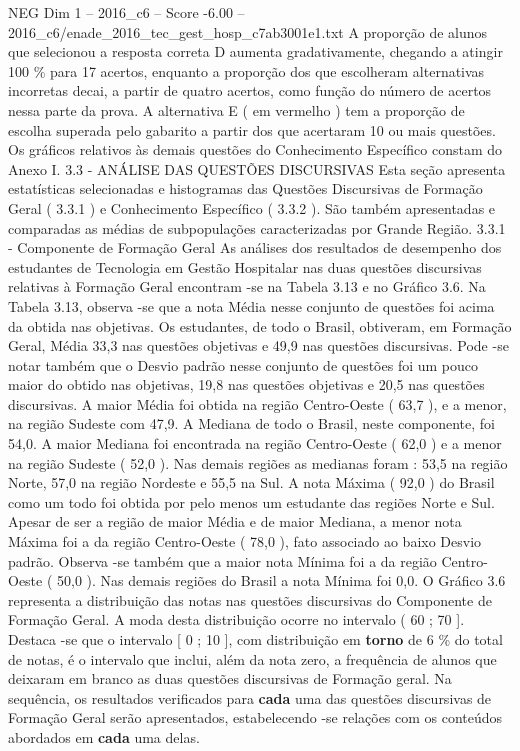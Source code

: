 \begin{textsample}{NEG Dim 1 – 2016\_c6 – Score -6.00 – 2016\_c6/enade\_2016\_tec\_gest\_hosp\_c7ab3001e1.txt}
A proporção de alunos que selecionou a resposta correta D aumenta gradativamente, chegando a atingir 100 \% para 17 acertos, enquanto a proporção dos que escolheram alternativas incorretas decai, a partir de quatro acertos, como função do número de acertos nessa parte da prova.
A alternativa E ( em vermelho ) tem a proporção de escolha superada pelo gabarito a partir dos que acertaram 10 ou mais questões.
Os gráficos relativos às demais questões do Conhecimento Específico constam do Anexo I. 3.3 - ANÁLISE DAS QUESTÕES DISCURSIVAS Esta seção apresenta estatísticas selecionadas e histogramas das Questões Discursivas de Formação Geral ( 3.3.1 ) e Conhecimento Específico ( 3.3.2 ).
São também apresentadas e comparadas as médias de subpopulações caracterizadas por Grande Região. 3.3.1 - Componente de Formação Geral As análises dos resultados de desempenho dos estudantes de Tecnologia em Gestão Hospitalar nas duas questões discursivas relativas à Formação Geral encontram -se na Tabela 3.13 e no Gráfico 3.6.
Na Tabela 3.13, observa -se que a nota Média nesse conjunto de questões foi acima da obtida nas objetivas.
Os estudantes, de todo o Brasil, obtiveram, em Formação Geral, Média 33,3 nas questões objetivas e 49,9 nas questões discursivas.
Pode -se notar também que o Desvio padrão nesse conjunto de questões foi um pouco maior do obtido nas objetivas, 19,8 nas questões objetivas e 20,5 nas questões discursivas.
A maior Média foi obtida na região Centro-Oeste ( 63,7 ), e a menor, na região Sudeste com 47,9.
A Mediana de todo o Brasil, neste componente, foi 54,0.
A maior Mediana foi encontrada na região Centro-Oeste ( 62,0 ) e a menor na região Sudeste ( 52,0 ).
Nas demais regiões as medianas foram : 53,5 na região Norte, 57,0 na região Nordeste e 55,5 na Sul.
A nota Máxima ( 92,0 ) do Brasil como um todo foi obtida por pelo menos um estudante das regiões Norte e Sul.
Apesar de ser a região de maior Média e de maior Mediana, a menor nota Máxima foi a da região Centro-Oeste ( 78,0 ), fato associado ao baixo Desvio padrão.
Observa -se também que a maior nota Mínima foi a da região Centro-Oeste ( 50,0 ).
Nas demais regiões do Brasil a nota Mínima foi 0,0.
O Gráfico 3.6 representa a distribuição das notas nas questões discursivas do Componente de Formação Geral.
A moda desta distribuição ocorre no intervalo ( 60 ; 70 ].
Destaca -se que o intervalo [ 0 ; 10 ], com distribuição em \textbf{torno} de 6 \% do total de notas, é o intervalo que inclui, além da nota zero, a frequência de alunos que deixaram em branco as duas questões discursivas de Formação geral.
Na sequência, os resultados verificados para \textbf{cada} uma das questões discursivas de Formação Geral serão apresentados, estabelecendo -se relações com os conteúdos abordados em \textbf{cada} uma delas.

\end{textsample}
